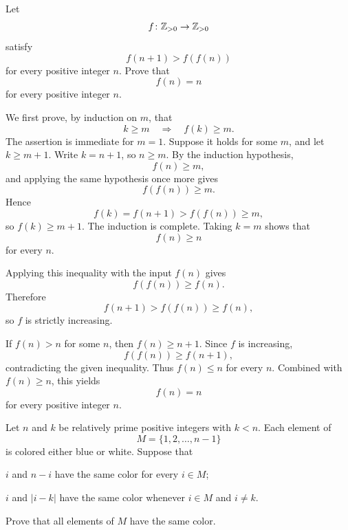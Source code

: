     \begin{expectedproblem}[1977 IMO]
        Let
        \[
            f\colon\mathbb{Z}_{>0}\to\mathbb{Z}_{>0}
        \]
        satisfy
        \[
            f(n+1)>f(f(n))
        \]
        for every positive integer $n$. Prove that
        \[
            f(n)=n
        \]
        for every positive integer $n$.
    \end{expectedproblem}

    \begin{solution}
        We first prove, by induction on $m$, that
        \[
            k\geq m
            \quad\Longrightarrow\quad
            f(k)\geq m.
        \]
        The assertion is immediate for $m=1$. Suppose it holds for some $m$,
        and let $k\geq m+1$. Write $k=n+1$, so $n\geq m$. By the induction
        hypothesis,
        \[
            f(n)\geq m,
        \]
        and applying the same hypothesis once more gives
        \[
            f(f(n))\geq m.
        \]
        Hence
        \[
            f(k)=f(n+1)>f(f(n))\geq m,
        \]
        so $f(k)\geq m+1$. The induction is complete. Taking $k=m$ shows that
        \[
            f(n)\geq n
        \]
        for every $n$.

        Applying this inequality with the input $f(n)$ gives
        \[
            f(f(n))\geq f(n).
        \]
        Therefore
        \[
            f(n+1)>f(f(n))\geq f(n),
        \]
        so $f$ is strictly increasing.

        If $f(n)>n$ for some $n$, then $f(n)\geq n+1$. Since $f$ is
        increasing,
        \[
            f(f(n))\geq f(n+1),
        \]
        contradicting the given inequality. Thus $f(n)\leq n$ for every $n$.
        Combined with $f(n)\geq n$, this yields
        \[
            \boxed{f(n)=n}
        \]
        for every positive integer $n$.
    \end{solution}

    \begin{expectedproblem}[1985 IMO]
        Let $n$ and $k$ be relatively prime positive integers with $k<n$. Each
        element of
        \[
            M=\{1,2,\ldots,n-1\}
        \]
        is colored either blue or white. Suppose that
        \begin{problemchoices}
            \item $i$ and $n-i$ have the same color for every $i\in M$;
            \item $i$ and $|i-k|$ have the same color whenever
                  $i\in M$ and $i\neq k$.
        \end{problemchoices}
        Prove that all elements of $M$ have the same color.
    \end{expectedproblem}

